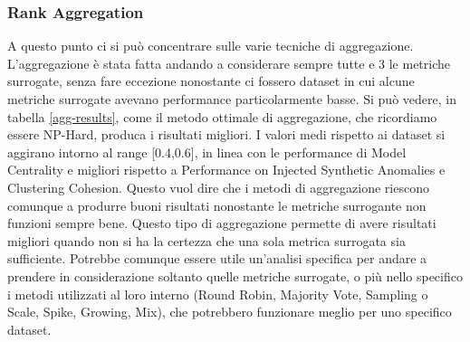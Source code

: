 \newpage
\subsubsection{Rank Aggregation}
A questo punto ci si può concentrare sulle varie tecniche di aggregazione. L'aggregazione è stata fatta andando a considerare sempre tutte e 3 le metriche surrogate, senza fare eccezione nonostante ci fossero dataset in cui alcune metriche surrogate avevano performance particolarmente basse. 
Si può vedere, in tabella \ref{agg-results}, come il metodo ottimale di aggregazione, che ricordiamo essere NP-Hard, produca i risultati migliori. 
I valori medi rispetto ai dataset si aggirano intorno al range [0.4,0.6], in linea con le performance di Model Centrality e migliori rispetto a Performance on Injected Synthetic Anomalies e Clustering Cohesion. Questo vuol dire che i metodi di aggregazione riescono comunque a produrre buoni risultati nonostante le metriche surrogante non funzioni sempre bene. 
Questo tipo di aggregazione permette di avere risultati migliori quando non si ha la certezza che una sola metrica surrogata sia sufficiente. Potrebbe comunque essere utile un'analisi specifica per andare a prendere in considerazione soltanto quelle metriche surrogate, o più nello specifico i metodi utilizzati al loro interno (Round Robin, Majority Vote, Sampling o Scale, Spike, Growing, Mix), che potrebbero funzionare meglio per uno specifico dataset. 


